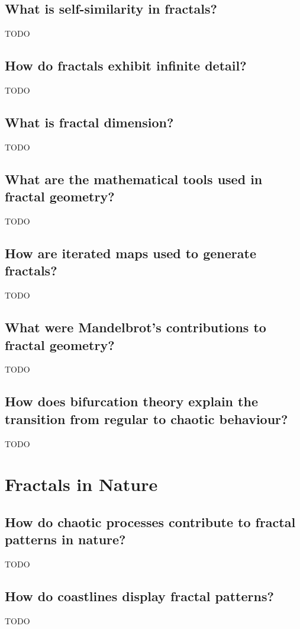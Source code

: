 \documentclass[12pt]{article}
\begin{document}
\subsection{What is self-similarity in fractals?}
TODO

\subsection{How do fractals exhibit infinite detail?}
TODO

\subsection{What is fractal dimension?}
TODO

\subsection{What are the mathematical tools used in fractal geometry?}
TODO

\subsection{How are iterated maps used to generate fractals?}
TODO

\subsection{What were Mandelbrot's contributions to fractal geometry?}
TODO

\subsection{How does bifurcation theory explain the transition from regular to chaotic behaviour?}
TODO

\section{Fractals in Nature}
\subsection{How do chaotic processes contribute to fractal patterns in nature?}
TODO

\subsection{How do coastlines display fractal patterns?}
TODO
\end{document}
